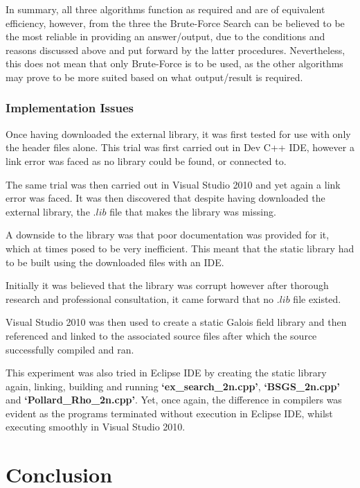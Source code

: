\documentclass[iwp,first]{luthesis}
\begin{document}
In summary, all three algorithms function as required and are of equivalent efficiency, however, from the three the Brute-Force Search can be believed to be the most reliable in providing an answer/output, due to the conditions and reasons discussed above and put forward by the latter procedures. Nevertheless, this does not mean that only Brute-Force is to be used, as the other algorithms may prove to be more suited based on what output/result is required.

\subsection{Implementation Issues}

Once having downloaded the external library, it was first tested for use with only the header files alone. This trial was first carried out in Dev C++ IDE, however a link error was faced as no library could be found, or connected to.

The same trial was then carried out in Visual Studio 2010 and yet again a link error was faced. It was then discovered that despite having downloaded the external library, the $.lib$ file that makes the library was missing.

A downside to the library was that poor documentation was provided for it, which at times posed to be very inefficient. This meant that the static library had to be built using the downloaded files with an IDE.

Initially it was believed that the library was corrupt however after thorough research and professional consultation, it came forward that no $.lib$ file existed. 

Visual Studio 2010 was then used to create a static Galois field library and then referenced and linked to the associated source files after which the source successfully compiled and ran. 

This experiment was also tried in Eclipse IDE by creating the static library again, linking, building and running \textbf{`ex\_search\_2n.cpp'}, \textbf{`BSGS\_2n.cpp'} and \textbf{`Pollard\_Rho\_2n.cpp'}. Yet, once again, the difference in compilers was evident as the programs terminated without execution in Eclipse IDE, whilst executing smoothly in Visual Studio 2010.






\chapter{Conclusion}
\end{document}
